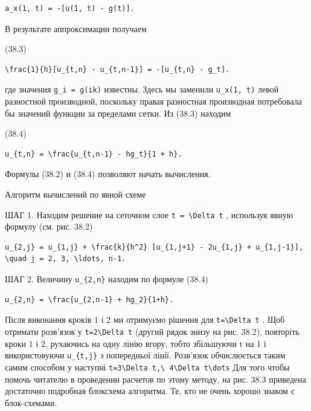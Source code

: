\documentclass[
  ukrainian,
]{article}
\begin{document}
\begin{verbatim}
a_x(1, t) = -[u(1, t) - g(t)].
\end{verbatim}

В результате аппроксимации получаем

(38.3)

\begin{verbatim}
\frac{1}{h}[u_{t,n} - u_{t,n-1}] = -[u_{t,n} - g_t].
\end{verbatim}

где значения \texttt{g\_i\ =\ g(ik)} известны. Здесь мы заменили
\texttt{u\_x(1,\ t)} левой разностной производной, поскольку правая
разностная производная потребовала бы значений функции за пределами
сетки. Из (38.3) находим

(38.4)

\begin{verbatim}
u_{t,n} = \frac{u_{t,n-1} - hg_t}{1 + h}.
\end{verbatim}

Формулы (38.2) и (38.4) позволяют начать вычисления.

Алгоритм вычислений по явной схеме

ШАГ 1. Находим решение на сеточном слое
\texttt{t\ =\ \textbackslash{}Delta\ t} , используя явную формулу (см.
рис. 38.2)

\begin{verbatim}
u_{2,j} = u_{1,j} + \frac{k}{h^2} [u_{1,j+1} - 2u_{1,j} + u_{1,j-1}], \quad j = 2, 3, \ldots, n-1.
\end{verbatim}

ШАГ 2. Величину \texttt{u\_\{2,n\}} находим по формуле (38.4)

\begin{verbatim}
u_{2,n} = \frac{u_{2,n-1} + hg_2}{1+h}.
\end{verbatim}

Після виконання кроків 1 і 2 ми отримуємо рішення для
\texttt{t=\textbackslash{}Delta\ t} . Щоб отримати розв'язок у
\texttt{t=2\textbackslash{}Delta\ t} (другий рядок знизу на рис. 38.2),
повторіть кроки 1 і 2, рухаючись на одну лінію вгору, тобто збільшуючи t
на 1 і використовуючи \texttt{u\_\{t,j\}} з попередньої лінії. Розв'язок
обчислюється таким самим способом у наступні
\texttt{t=3\textbackslash{}Delta\ t,\textbackslash{}\ 4\textbackslash{}Delta\ t\textbackslash{}dots}
Для того чтобы помочь читателю в проведении расчетов по этому методу, на
рис. 38.3 приведена достаточно подробная блоксхема алгоритма. Те, кто не
очень хорошо знаком с блок-схемами.
\end{document}
